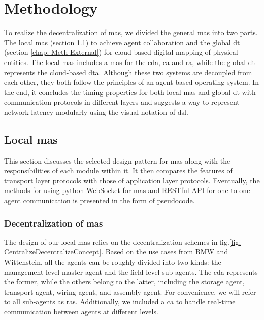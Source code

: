 \chapter{Methodology}\label{chap: Meth}%
To realize the decentralization of \gls{mas}, we divided the general \gls{mas} into 
two parts. The local \gls{mas} (section \ref{chap: Meth-Internal}) to achieve agent 
collaboration and the global \gls{dt} (section \ref{chap: Meth-External})
for cloud-based digital mapping of physical entities. The local \gls{mas} 
includes a \gls{mas} for the \gls{cda}, \gls{ca} and \gls{ra}, 
while the global \gls{dt} represents the cloud-based \gls{dta}. 
Although these two systems are decoupled from each other, 
they both follow the principles of an agent-based operating system. 
In the end, it concludes the timing properties for both 
local \gls{mas} and global \gls{dt} with communication protocols in 
different layers and suggests a way to represent 
network latency modularly using the visual notation of \gls{dsl}. 




\section{Local \gls{mas}}\label{chap: Meth-Internal}%

This section discusses the selected design pattern for \gls{mas} along 
with the responsibilities of each module within it.
It then compares the features of transport layer protocols with those of 
application layer protocols.
Eventually, the methods for using python WebSocket for \gls{mas} and 
RESTful API for one-to-one agent communication is presented in the form of pseudocode. 


\subsection{Decentralization of \gls{mas}}
The design of our local \gls{mas} relies on the decentralization 
schemes in fig.\ref{fig: CentralizeDecentralizeConcept}. 
Based on the use cases from BMW and Wittenstein, all the agents can be roughly 
divided into two kinds: the management-level master agent and the field-level sub-agents. 
The \gls{cda} represents the former, while the others belong to the latter, 
including the storage agent, transport agent, wiring agent, and assembly agent. For 
convenience, we will refer to all sub-agents as \gls{ras}. Additionally, we included 
a \gls{ca} to handle real-time communication between agents at different levels. 



